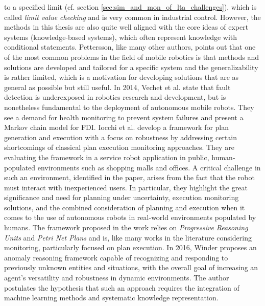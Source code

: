 \documentclass[english, master, utf8]{base/thesis_KBS}
\begin{document}
to a specified limit (cf. section \ref{sec:sim_and_mon_of_lta_challenges}), which is called \textit{limit value checking} and is very common in industrial control. \cite{Pettersson:2005} However, the methods in this thesis are also
quite well aligned with the core ideas of expert systems (knowledge-based systems), which often represent knowledge with conditional statements. \cite{Pettersson:2005} Pettersson,
like many other authors, points out that one of the most common problems in the field of mobile robotics is that methods and solutions are developed and tailored for a specific
system and the generalizability is rather limited, which is a motivation for developing solutions that are as general as possible but still useful.\newline
In 2014, Vechet et al. \cite{Vechet:2015} state that fault detection is underexposed in robotics research and development, but is nonetheless fundamental to the
deployment of autonomous mobile robots. They see a demand for health monitoring to prevent system failures and present a Markov chain model for FDI.\newline
Iocchi et al. \cite{Iocchi:2016} develop a framework for plan generation and execution with a focus on robustness by addressing certain shortcomings of classical plan execution
monitoring approaches. They are evaluating the framework in a service robot application in public, human-populated environments such as shopping malls and offices. A critical
challenge in such an environment, identified in the paper, arises from the fact that the robot must interact with inexperienced users. In particular, they highlight the great
significance and need for planning under uncertainty, execution monitoring solutions, and the combined consideration of planning and execution when it comes to the use of
autonomous robots in real-world environments populated by humans. The framework proposed in the work relies on \textit{Progressive Reasoning Units} and \textit{Petri Net Plans}
and is, like many works in the literature considering monitoring, particularly focused on plan execution.\newline
In 2016, Winder \cite{Winder:2016} proposes an anomaly reasoning framework capable of recognizing and responding to previously unknown entities and situations, with the overall goal of
increasing an agent's versatility and robustness in dynamic environments. The author postulates the hypothesis that such an approach requires the integration of machine learning
methods and systematic knowledge representation.\newline
\end{document}
